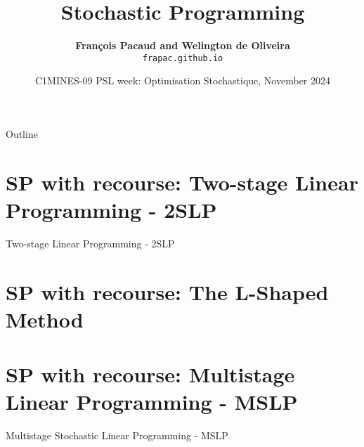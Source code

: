 \documentclass[slidstop,compress,8pt]{beamer}
\title{Stochastic Programming \newline {\small Stochastic programming with recourse}}
\author{{\bf Fran\c{c}ois Pacaud  and Welington de Oliveira} \\
{\scriptsize \texttt{frapac.github.io}}
}
\institute{\bf Centre Automatique et Systèmes - CAS \\
\'Ecole Nationale Sup\'erieure des Mines de Paris - Mines Paris PSL %
}
\date{C1MINES-09 PSL week: Optimisation Stochastique, November 2024}
\begin{document}



\begin{frame}{Outline}
\tableofcontents %
\end{frame}





%
\section{SP with recourse: Two-stage Linear Programming - 2SLP}
\begin{frame}{ }
\begin{block}{\Large Two-stage Linear Programming - 2SLP}
\end{block}
\end{frame}

%

\section{SP with recourse: The L-Shaped Method}
\begin{frame}{ }
\begin{center}
\end{center}
\end{frame}
%

%
\section{SP with recourse: Multistage Linear Programming - MSLP}
\begin{frame}{ }
\begin{block}{\Large Multistage Stochastic Linear Programming - MSLP}
\end{block}
\end{frame}

\end{document}
